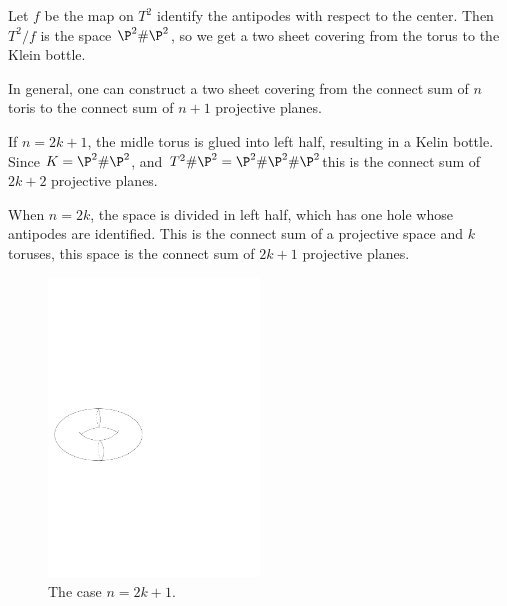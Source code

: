 \begin{example}\label{tori cover proj}
Let $f$ be the map on $T^2$ identify the antipodes with respect to the center. Then $T^2/f$ is the space $\P^2\#\P^2$, so we get a two sheet covering from the torus to the Klein bottle.\par
In general, one can construct a two sheet covering from the connect sum of $n$ toris to the connect sum of $n+1$ projective planes.\par
If $n=2k+1$, the midle torus is glued into left half, resulting in a Kelin bottle. Since $K=\P^2\#\P^2$, and $T^2\#\P^2=\P^2\#\P^2\#\P^2$this is the connect sum of $2k+2$ projective planes.\par
When $n=2k$, the space is divided in left half, which has one hole whose antipodes are identified. This is the connect sum of a projective space and $k$ toruses, this space is the connect sum of $2k+1$ projective planes.
\begin{figure}[htbp]
\centering
\begin{minipage}{200pt}
\centering
\includegraphics[width=0.5\textwidth]{pictures/cover-by-tori-1}
\caption{The case $n=2k+1$.}
\end{minipage}
\hspace{20pt}
\begin{minipage}{200pt}
\centering

\end{minipage}
\end{figure}
\end{example}
